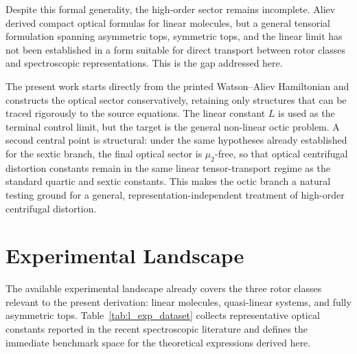 \documentclass[aip,jcp,reprint,floatfix]{revtex4-2}
\begin{document}
Despite this formal generality, the high-order sector remains incomplete.
Aliev derived compact optical formulas for linear molecules, but a general
tensorial formulation spanning asymmetric tops, symmetric tops, and the linear
limit has not been established in a form suitable for direct transport between
rotor classes and spectroscopic representations. This is the gap addressed
here.

The present work starts directly from the printed Watson--Aliev Hamiltonian and
constructs the optical sector conservatively, retaining only structures that
can be traced rigorously to the source equations. The linear constant \(L\) is
used as the terminal control limit, but the target is the general non-linear
octic problem. A second central point is structural: under the same hypotheses
already established for the sextic branch, the final optical sector is
\(\mu_2\)-free, so that optical centrifugal distortion constants remain in the
same linear tensor-transport regime as the standard quartic and sextic
constants. This makes the octic branch a natural testing ground for a general,
representation-independent treatment of high-order centrifugal distortion.

\section{Experimental Landscape}

The available experimental landscape already covers the three rotor classes
relevant to the present derivation: linear molecules, quasi-linear systems, and
fully asymmetric tops. Table~\ref{tab:l_exp_dataset} collects representative
optical constants reported in the recent spectroscopic literature and defines
the immediate benchmark space for the theoretical expressions derived here.
\end{document}

